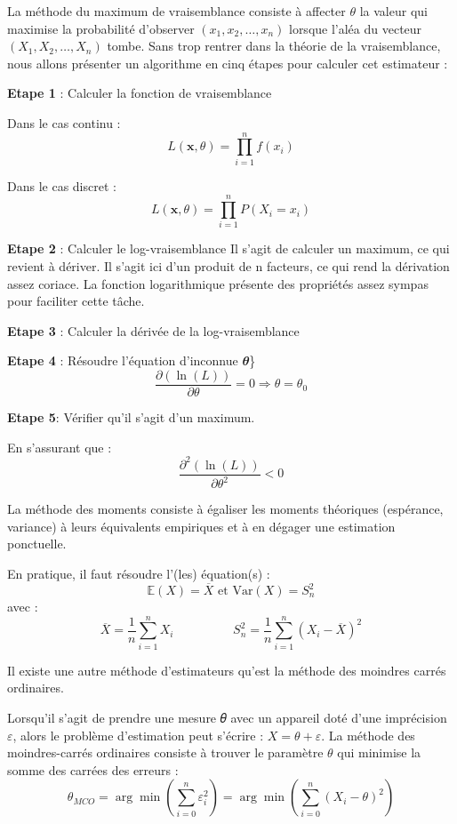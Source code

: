 \documentclass[
  letterpaper,
  DIV=11,
  numbers=noendperiod]{scrartcl}
\begin{document}
La méthode du maximum de vraisemblance consiste à affecter \(𝜃\) la
valeur qui maximise la probabilité d'observer \((𝑥_1, 𝑥_2, … , 𝑥_𝑛)\)
lorsque l'aléa du vecteur \((𝑋_1, 𝑋_2, … , 𝑋_𝑛)\) tombe. Sans trop
rentrer dans la théorie de la vraisemblance, nous allons présenter un
algorithme en cinq étapes pour calculer cet estimateur :

\textbf{Etape 1} : Calculer la fonction de vraisemblance

Dans le cas continu : \[L(\mathbf{x}, \theta) = \prod_{i=1}^{n} f(x_i)\]

Dans le cas discret :
\[L(\mathbf{x}, \theta) = \prod_{i=1}^{n} P(X_i = x_i)\]

\textbf{Etape 2} : Calculer le log-vraisemblance Il s'agit de calculer
un maximum, ce qui revient à dériver. Il s'agit ici d'un produit de n
facteurs, ce qui rend la dérivation assez coriace. La fonction
logarithmique présente des propriétés assez sympas pour faciliter cette
tâche.

\textbf{Etape 3} : Calculer la dérivée de la log-vraisemblance

\textbf{Etape 4} : Résoudre l'équation d'inconnue \(𝜽\)\}
\[\frac{\partial (\ln(L))}{\partial \theta} = 0 \Rightarrow \theta = \theta_0\]

\textbf{Etape 5}: Vérifier qu'il s'agit d'un maximum.

En s'assurant que :
\[\frac{\partial^2 (\ln(L))}{\partial \theta^2} < 0\]

\newpage

La méthode des moments consiste à égaliser les moments théoriques
(espérance, variance) à leurs équivalents empiriques et à en dégager une
estimation ponctuelle.

En pratique, il faut résoudre l'(les) équation(s) :
\[\mathbb{E}(X) = \overline{X} \text{ et } \text{Var}(X) = S_n^2\] avec
: \[\overline{X} = \frac{1}{n} \sum_{i=1}^{n} X_i \hspace{2cm}
 S_n^2 = \frac{1}{n} \sum_{i=1}^{n} (X_i - \overline{X})^2\]

Il existe une autre méthode d'estimateurs qu'est la méthode des moindres
carrés ordinaires.

Lorsqu'il s'agit de prendre une mesure 𝜃 avec un appareil doté d'une
imprécision \(𝜀\), alors le problème d'estimation peut s'écrire :
\(𝑋 = 𝜃 + 𝜀\). La méthode des moindres-carrés ordinaires consiste à
trouver le paramètre \(𝜃\) qui minimise la somme des carrées des erreurs
:
\[𝜃_{𝑀𝐶𝑂} = \arg\min \left( \sum_{i=0}^n \varepsilon_i^2 \right) = \arg\min \left( \sum_{i=0}^n (X_i - \theta)^2 \right)\]
\end{document}
